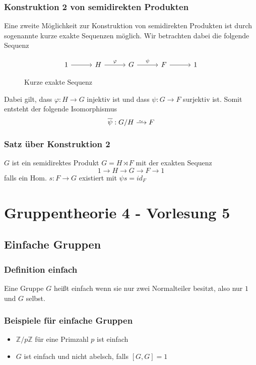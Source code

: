 \documentclass[12pt, german]{article}
\newcommand\iso{\xrightarrow{
		\,\smash{\raisebox{-0.65ex}{\ensuremath{\scriptstyle\sim}}}\,}}
\begin{document}
\subsubsection{Konstruktion 2 von semidirekten Produkten}
Eine zweite Möglichkeit zur Konstruktion von semidirekten Produkten ist durch sogenannte kurze exakte Sequenzen möglich. 
Wir betrachten dabei die folgende Sequenz
\begin{figure}[h!]
	\centering
	\begin{equation*}
	\begin{tikzcd}[column sep=2.5pc]
	1 \arrow{r}{} & H \arrow{r}{\varphi} & G \arrow{r}{\psi} & F \arrow{r}{} & 1
	\end{tikzcd}
	\end{equation*}
	\caption{Kurze exakte Sequenz}
\end{figure} 

Dabei gilt, dass $\varphi : H \to G$ injektiv ist und dass $\psi : G \to F$ surjektiv ist. Somit entsteht der folgende Isomorphismus $$\overline{\psi} : G/H \iso F$$

\subsubsection{Satz über Konstruktion 2}
$G$ ist ein semidirektes Produkt $G = H\rtimes F$ mit der exakten Sequenz $$1 \to H \to G \to F \to 1$$ falls ein Hom. $s: F \to G$ existiert  mit $\psi s = id_F$

\section{Gruppentheorie 4 - Vorlesung 5}
\subsection{Einfache Gruppen}
\subsubsection{Definition einfach}
	Eine Gruppe $G$ heißt einfach wenn sie nur zwei Normalteiler besitzt, also nur $1$ und $G$ selbst.

\subsubsection{Beispiele für einfache Gruppen}
 \begin{itemize}
 	\item $\mathbb Z / p \mathbb Z$ für eine Primzahl $p$ ist einfach 
 	\item $G$ ist einfach und nicht abelsch, falls $[G, G] =1$
 \end{itemize}
\end{document}
